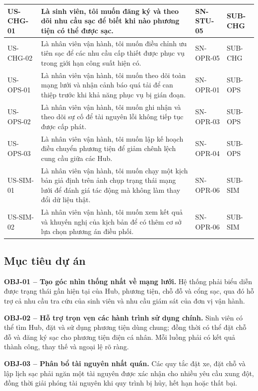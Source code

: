 \begin{longtable}{|L{22mm}|L{72mm}|L{23mm}|L{20mm}|}
  \hline
  US-CHG-01 & Là sinh viên, tôi muốn đăng ký và theo dõi nhu cầu sạc để biết khi nào phương tiện có thể được sạc. & SN-STU-05 & SUB-CHG\\
  \hline
  US-CHG-02 & Là nhân viên vận hành, tôi muốn điều chỉnh ưu tiên sạc để các nhu cầu cấp thiết được phục vụ trong giới hạn công suất hiện có. & SN-OPR-05 & SUB-CHG\\
  \hline
  US-OPS-01 & Là nhân viên vận hành, tôi muốn theo dõi toàn mạng lưới và nhận cảnh báo quá tải để can thiệp trước khi khả năng phục vụ bị gián đoạn. & SN-OPR-01 & SUB-OPS\\
  \hline
  US-OPS-02 & Là nhân viên vận hành, tôi muốn ghi nhận và theo dõi sự cố để tài nguyên lỗi không tiếp tục được cấp phát. & SN-OPR-03 & SUB-OPS\\
  \hline
  US-OPS-03 & Là nhân viên vận hành, tôi muốn lập kế hoạch điều chuyển phương tiện để giảm chênh lệch cung cầu giữa các Hub. & SN-OPR-04 & SUB-OPS\\
  \hline
  US-SIM-01 & Là nhân viên vận hành, tôi muốn chạy một kịch bản giả định trên ảnh chụp trạng thái mạng lưới để đánh giá tác động mà không làm thay đổi dữ liệu thật. & SN-OPR-06 & SUB-SIM\\
  \hline
  US-SIM-02 & Là nhân viên vận hành, tôi muốn xem kết quả và khuyến nghị của kịch bản để có thêm cơ sở lựa chọn phương án điều phối. & SN-OPR-06 & SUB-SIM\\
  \hline
\end{longtable}
\endgroup

\subsection{Mục tiêu dự án}

\noindent\textbf{OBJ-01 -- Tạo góc nhìn thống nhất về mạng lưới.}
Hệ thống phải biểu diễn được trạng thái gần hiện tại của Hub, phương tiện, chỗ đỗ và cổng sạc, qua đó hỗ trợ cả nhu cầu tra cứu của sinh viên và nhu cầu giám sát của đơn vị vận hành.

\medskip
\noindent\textbf{OBJ-02 -- Hỗ trợ trọn vẹn các hành trình sử dụng chính.}
Sinh viên có thể tìm Hub, đặt và sử dụng phương tiện dùng chung; đồng thời có thể đặt chỗ đỗ và đăng ký sạc cho phương tiện điện cá nhân. Mỗi luồng phải có kết quả thành công, thay thế và ngoại lệ rõ ràng.

\medskip
\noindent\textbf{OBJ-03 -- Phân bổ tài nguyên nhất quán.}
Các quy tắc đặt xe, đặt chỗ và lập lịch sạc phải ngăn một tài nguyên được xác nhận cho nhiều yêu cầu xung đột, đồng thời giải phóng tài nguyên khi quy trình bị hủy, hết hạn hoặc thất bại.

